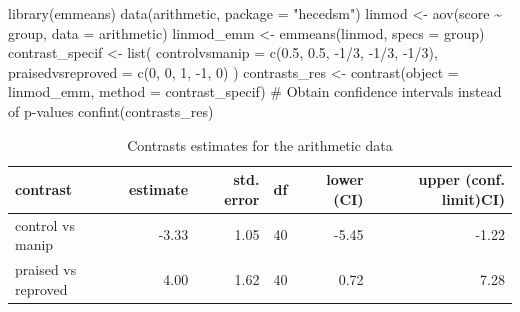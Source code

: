 \documentclass[
  11pt,
  letterpaper,
]{scrbook}
\newenvironment{Shaded}{\begin{snugshade}}{\end{snugshade}}
\newcommand{\AttributeTok}[1]{\textcolor[rgb]{0.40,0.45,0.13}{#1}}
\newcommand{\CommentTok}[1]{\textcolor[rgb]{0.37,0.37,0.37}{#1}}
\newcommand{\DecValTok}[1]{\textcolor[rgb]{0.68,0.00,0.00}{#1}}
\newcommand{\FloatTok}[1]{\textcolor[rgb]{0.68,0.00,0.00}{#1}}
\newcommand{\FunctionTok}[1]{\textcolor[rgb]{0.28,0.35,0.67}{#1}}
\newcommand{\NormalTok}[1]{\textcolor[rgb]{0.00,0.23,0.31}{#1}}
\newcommand{\OtherTok}[1]{\textcolor[rgb]{0.00,0.23,0.31}{#1}}
\newcommand{\SpecialCharTok}[1]{\textcolor[rgb]{0.37,0.37,0.37}{#1}}
\newcommand{\StringTok}[1]{\textcolor[rgb]{0.13,0.47,0.30}{#1}}
\theoremstyle{definition}
\theoremstyle{remark}
\begin{document}
\begin{Shaded}
\begin{Highlighting}[]
\FunctionTok{library}\NormalTok{(emmeans)}
\FunctionTok{data}\NormalTok{(arithmetic, }\AttributeTok{package =} \StringTok{"hecedsm"}\NormalTok{)}
\NormalTok{linmod }\OtherTok{\textless{}{-}} \FunctionTok{aov}\NormalTok{(score }\SpecialCharTok{\textasciitilde{}}\NormalTok{ group, }\AttributeTok{data =}\NormalTok{ arithmetic)}
\NormalTok{linmod\_emm }\OtherTok{\textless{}{-}} \FunctionTok{emmeans}\NormalTok{(linmod, }\AttributeTok{specs =} \StringTok{\textquotesingle{}group\textquotesingle{}}\NormalTok{)}
\NormalTok{contrast\_specif }\OtherTok{\textless{}{-}} \FunctionTok{list}\NormalTok{(}
  \AttributeTok{controlvsmanip =} \FunctionTok{c}\NormalTok{(}\FloatTok{0.5}\NormalTok{, }\FloatTok{0.5}\NormalTok{, }\SpecialCharTok{{-}}\DecValTok{1}\SpecialCharTok{/}\DecValTok{3}\NormalTok{, }\SpecialCharTok{{-}}\DecValTok{1}\SpecialCharTok{/}\DecValTok{3}\NormalTok{, }\SpecialCharTok{{-}}\DecValTok{1}\SpecialCharTok{/}\DecValTok{3}\NormalTok{),}
  \AttributeTok{praisedvsreproved =} \FunctionTok{c}\NormalTok{(}\DecValTok{0}\NormalTok{, }\DecValTok{0}\NormalTok{, }\DecValTok{1}\NormalTok{, }\SpecialCharTok{{-}}\DecValTok{1}\NormalTok{, }\DecValTok{0}\NormalTok{)}
\NormalTok{)}
\NormalTok{contrasts\_res }\OtherTok{\textless{}{-}} 
  \FunctionTok{contrast}\NormalTok{(}\AttributeTok{object =}\NormalTok{ linmod\_emm, }
                    \AttributeTok{method =}\NormalTok{ contrast\_specif)}
\CommentTok{\# Obtain confidence intervals instead of p{-}values}
\FunctionTok{confint}\NormalTok{(contrasts\_res)}
\end{Highlighting}
\end{Shaded}

\hypertarget{tbl-contrast-arithmetic-confint}{}
\begin{table}
\caption{\label{tbl-contrast-arithmetic-confint}Contrasts estimates for the arithmetic data }\tabularnewline

\centering
\begin{tabular}{lrrrrr}
\toprule
contrast & estimate & std. error & df & lower (CI) & upper (conf. limit)CI)\\
\midrule
control vs manip & -3.33 & 1.05 & 40 & -5.45 & -1.22\\
praised vs reproved & 4.00 & 1.62 & 40 & 0.72 & 7.28\\
\bottomrule
\end{tabular}
\end{table}
\end{document}

